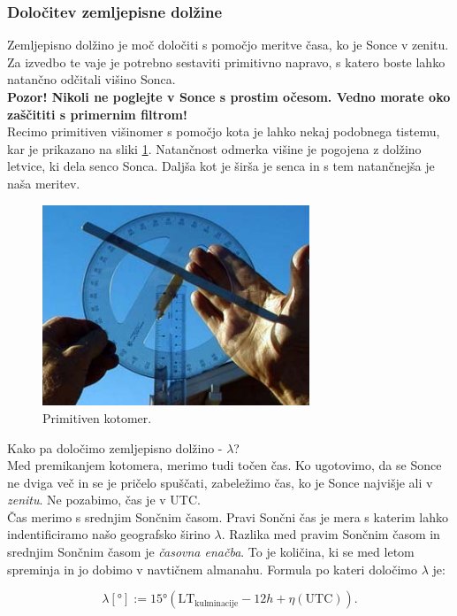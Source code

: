 \documentclass[11pt]{article}
\begin{document}
\subsubsection{Določitev zemljepisne dolžine}
Zemljepisno dolžino je moč določiti s pomočjo meritve časa, ko je Sonce v zenitu. Za izvedbo te vaje je potrebno sestaviti primitivno napravo, s katero boste lahko natančno odčitali višino Sonca.\\[2mm]
%
\textbf{Pozor! Nikoli ne poglejte v Sonce s prostim očesom. Vedno morate oko zaščititi s primernim filtrom!}\\[2mm]
%
Recimo primitiven višinomer s pomočjo kota je lahko nekaj podobnega tistemu, kar je prikazano na sliki \ref{fig:v_cas_kotomer}. Natančnost odmerka višine je pogojena z dolžino letvice, ki dela senco Sonca. Daljša kot je širša je senca in s tem natančnejša je naša meritev. 
%
\begin{figure}[!htbp]
	\centering \includegraphics[width=8cm]{figs/kotomer.jpg}
	\caption{Primitiven kotomer.}
	\label{fig:v_cas_kotomer}
\end{figure}
%
Kako pa določimo zemljepisno dolžino - $\lambda$?\\[2mm]
%
Med premikanjem kotomera, merimo tudi točen čas. Ko ugotovimo, da se Sonce ne dviga več in se je pričelo spuščati, zabeležimo čas, ko je Sonce najvišje ali v \emph{zenitu}. Ne pozabimo, čas je v UTC.\\[2mm]
%
Čas merimo s srednjim Sončnim časom. Pravi Sončni čas je mera s katerim lahko indentificiramo našo geografsko širino $\lambda$. Razlika med pravim Sončnim časom in srednjim Sončnim časom je \emph{časovna enačba}. To je količina, ki se med letom spreminja in jo dobimo v navtičnem almanahu. Formula po kateri določimo $\lambda$ je:

\begin{equation}
\label{eq:v_cas_lambda} 
\lambda[\si{\degree}] := 15\si{\degree} \left( \text{LT}_{\text{kulminacije}} - 12h + \eta(\text{UTC}) \right).
\end{equation}
\end{document}

